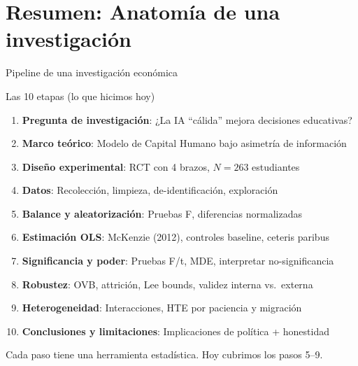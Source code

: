 \documentclass[aspectratio=169, 11pt]{beamer}
\begin{document}
\section{Resumen: Anatomía de una investigación}

\begin{frame}{Pipeline de una investigación económica}
\begin{block}{Las 10 etapas (lo que hicimos hoy)}
\small
\begin{enumerate}\setlength{\itemsep}{1pt}
  \item \textbf{Pregunta de investigación}: ¿La IA ``cálida'' mejora decisiones educativas?
  \item \textbf{Marco teórico}: Modelo de Capital Humano bajo asimetría de información
  \item \textbf{Diseño experimental}: RCT con 4 brazos, $N = 263$ estudiantes
  \item \textbf{Datos}: Recolección, limpieza, de-identificación, exploración
  \item \textbf{Balance y aleatorización}: Pruebas F, diferencias normalizadas
  \item \textbf{Estimación OLS}: McKenzie (2012), controles baseline, ceteris paribus
  \item \textbf{Significancia y poder}: Pruebas F/t, MDE, interpretar no-significancia
  \item \textbf{Robustez}: OVB, attrición, Lee bounds, validez interna vs.\ externa
  \item \textbf{Heterogeneidad}: Interacciones, HTE por paciencia y migración
  \item \textbf{Conclusiones y limitaciones}: Implicaciones de política + honestidad
\end{enumerate}
\end{block}
{\scriptsize Cada paso tiene una herramienta estadística. Hoy cubrimos los pasos 5--9.}
\end{frame}
\end{document}
